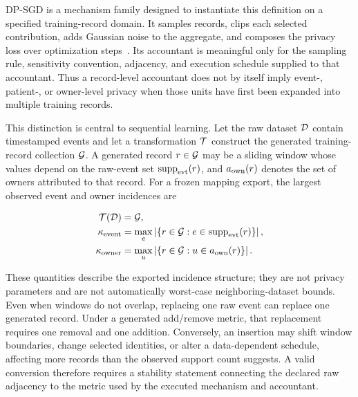 DP-SGD is a mechanism family designed to instantiate this definition on a
specified training-record domain.  It samples records, clips each selected
contribution, adds Gaussian noise to the aggregate, and composes the privacy loss over optimization
steps~\cite{abadi2016deep,ponomareva2023dpify}.  Its accountant is meaningful only
for the sampling rule, sensitivity convention, adjacency, and execution schedule
supplied to that accountant.  Thus a record-level accountant does not by itself
imply event-, patient-, or owner-level privacy when those units have first been
expanded into multiple training records.

This distinction is central to sequential learning.  Let the raw dataset
\(\mathcal{D}\) contain timestamped events and let a transformation
\(\mathcal{T}\) construct the generated training-record collection
\(\mathcal{G}\).  A generated record \(r\in\mathcal{G}\) may be a
sliding window whose values depend on the raw-event set \(\operatorname{supp}_{\mathrm{evt}}(r)\), and
\(a_{\mathrm{own}}(r)\) denotes the set of owners attributed to that record.  For
a frozen mapping export, the largest observed event and owner incidences are

\begin{equation}
\begin{aligned}
    \mathcal{T}(\mathcal{D}) &= \mathcal{G}, \\
    \kappa_{\mathrm{event}}
        &= \max_{e}
           \left|\left\{r\in\mathcal{G}:
           e\in\operatorname{supp}_{\mathrm{evt}}(r)\right\}\right|, \\
    \kappa_{\mathrm{owner}}
        &= \max_{u}
           \left|\left\{r\in\mathcal{G}:
           u\in a_{\mathrm{own}}(r)\right\}\right|.
\end{aligned}
\label{eq:ch2-incidence}
\end{equation}

These quantities describe the exported incidence structure; they are not privacy
parameters and are not automatically worst-case neighboring-dataset bounds.  Even
when windows do not overlap, replacing one raw event can replace one generated
record.  Under a generated add/remove metric, that replacement requires one
removal and one addition.  Conversely, an insertion may shift window boundaries,
change selected identities, or alter a data-dependent schedule, affecting more
records than the observed support count suggests.  A valid conversion therefore
requires a stability statement connecting the declared raw adjacency to the metric
used by the executed mechanism and accountant.

